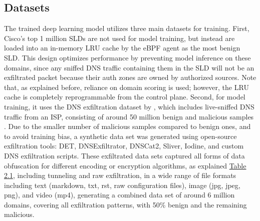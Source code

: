 \documentclass [11pt, proquest] {uwthesis}[2020/02/24]
\begin{document}
\subsection{Datasets}
\label{sec:dataset}
The trained deep learning model utilizes three main datasets for training. First, Cisco’s top 1 million SLDs are not used for model training, but instead are loaded into an in-memory LRU cache by the eBPF agent as the most benign SLD. This design optimizes performance by preventing model inference on these domains, since any sniffed DNS traffic containing them in the SLD will not be an exfiltrated packet because their auth zones are owned by authorized sources. Note that, as explained before, reliance on domain scoring is used; however, the LRU cache is completely reprogrammable from the control plane. Second, for model training, it uses the DNS exfiltration dataset by \citeauthor{ziza2023dns}, which includes live-sniffed DNS traffic from an ISP, consisting of around 50 million benign and malicious samples \cite{ziza2023dns}. Due to the smaller number of malicious samples compared to benign ones, and to avoid training bias, a synthetic data set was generated using open-source exfiltration tools: DET, DNSExfiltrator, DNSCat2, Sliver, Iodine, and custom DNS exfiltration scripts. These exfiltrated data sets captured all forms of data obfuscation for different encoding or encryption algorithms, as explained \hyperref[dns_payload_obfuscation]{Table 2.1}, including tunneling and raw exfiltration, in a wide range of file formats including text (markdown, txt, rst, raw configuration files), image (jpg, jpeg, png), and video (mp4), generating a combined data set of around 6 million domains, covering all exfiltration patterns, with 50\% benign and the remaining malicious.


\begin{table}[ht]
\centering
{}
\caption{DNS Features in Kernel}
\label{sec:feature-kernel}
\end{table}
\end{document}
